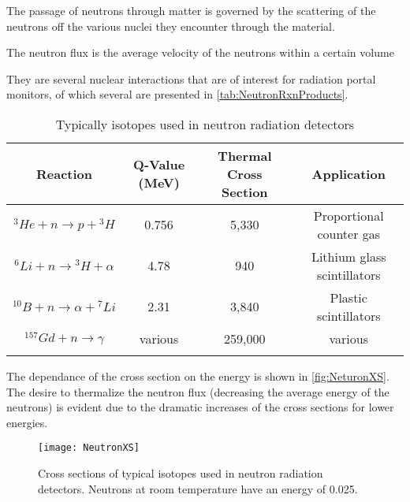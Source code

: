 
The passage of neutrons through matter is governed by the scattering of the neutrons off the various nuclei they encounter through the material.

The neutron flux is the average velocity of the neutrons within a certain volume

They are several nuclear interactions that are of interest for radiation portal monitors, of which several are presented in \autoref{tab:NeutronRxnProducts}.
\begin{table}
	\caption[Neutron Reactions and Reaction Energies]{Typically isotopes used in neutron radiation detectors}
	\label{tab:NeutronRxnProducts}
	\begin{tabular}{ c | c c c} 
		\toprule
		Reaction                           & Q-Value (MeV) & Thermal Cross Section & Application \\
		\midrule
		${}^3He + n \to p +{}^3H$          & 0.756     & 5,330 & Proportional counter gas \\
		${}^6Li + n \to {}^3H + \alpha$    & 4.78      & 940 & Lithium glass scintillators \\
		${}^{10}B + n \to \alpha + {}^7Li$ & 2.31      & 3,840 & Plastic scintillators \\
		${}^{157}Gd + n \to \gamma$        &various    & 259,000 & various \\
		\bottomrul
	\end{tabular}
\end{table}
The dependance of the cross section on the energy is shown in \autoref{fig:NeturonXS}.
The desire to thermalize the neutron flux (decreasing the average energy of the neutrons) is evident due to the dramatic increases of the cross sections for lower energies.
\begin{figure}
	\centering
	\texttt{[image: NeutronXS]}
	\caption[Neutron Reaction Cross Sections]{Cross sections of typical isotopes used in neutron radiation detectors.  Neutrons at room temperature have an energy of \SI{0.025}{\ev}.}
	\label{fig:NeutronXS}
\end{figure}